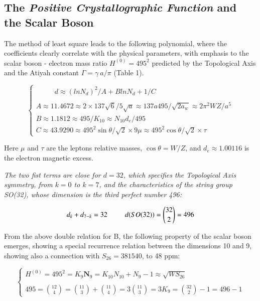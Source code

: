 \documentclass[a4paper,9pt]{article}
\begin{document}
\pagebreak

\subsection{The \textit{Positive Crystallographic Function} and the Scalar Boson}

The method of least square leads to the following polynomial, where the coefficients clearly correlate with the physical parameters, with emphasis to the scalar boson - electron mass ratio $H^{(0)} = 495^2$ predicted by the Topological Axis and the Atiyah constant $\Gamma = \gamma~a/\pi$ (Table 1).

\begin{equation}\label{Eq23}
 \left\{
    \begin{array}{ll}
        ~~~~~~~~~~~~ d \approx (lnN_d)^2/A + BlnN_d + 1/C\\
        \\
        A\approx 11.4672 \approx 2\times 137 \sqrt 6/5 \sqrt a\approx 137a495/\sqrt{2a_w}  \approx 2\pi^2WZ/a^5\\ 
        B \approx 1.1812 \approx 495/K_{10} \approx N_{10}d_e/495   \\ 
        C\approx 43.9290 \approx 495^2 \sin \theta/\sqrt2 \times 9\mu  \approx 495^2 \cos \theta/\sqrt2\times \tau
    \end{array}
\right.
\end{equation}

Here $\mu$ and $\tau$ are the leptons relative masses, $\cos \theta = W/Z$, and $d_e \approx 1.00116$ is the electron magnetic excess. 

 \textit{The two fist terms are close for $d = 32$, which specifies the Topological Axis symmetry, from $k = 0$ to $k = 7$, and the characteristics of the string group SO(32), whose dimension is the third perfect number 496:}
 
 
 \begin{equation}\label{Eq24}
 d_k + d_{7-k} = 32 ~~~~~~~~~~ d(SO(32)) =  \binom{32}{2} = 496 \\ 
 \end{equation}

From the above double relation for B, the following property of the scalar boson emerges, showing a special recurrence relation between the dimensions 10 and 9, showing also a connection with $S_{26} = 381540$, to 48 ppm:

\begin{equation}\label{Eq25}
 \left\{
    \begin{array}{ll} 
            H^{(0)} = 495^2 = K_{9}\textbf{N}_9 = K_{10} N_{10} + N_{9} - 1 \approx \sqrt{WS_{26}} \\ 
            \\
       495 = \binom{12}{4} = \binom{11}{3} + \binom{11}{4} = 3\binom{11}{3} = 3K_9 = \binom{32}{2} - 1 = 496 -1
    \end{array}
\right.
\end{equation}
\end{document}

